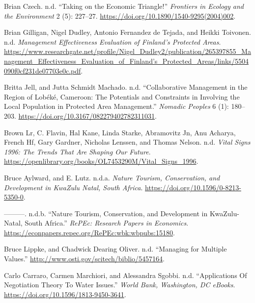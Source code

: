 \begin{CSLReferences}{1}{0}
Brian Czech. n.d. {``Taking on the Economic Triangle!''} \emph{Frontiers
in Ecology and the Environment} 2 (5): 227--27.
\url{https://doi.org/10.1890/1540-9295(2004)002}.

Brian Gilligan, Nigel Dudley, Antonio Fernandez de Tejada, and Heikki
Toivonen. n.d. \emph{Management Effectiveness Evaluation of Finland's
Protected Areas}.
\url{https://www.researchgate.net/profile/Nigel_Dudley2/publication/265397855_Management_Effectiveness_Evaluation_of_Finland’s_Protected_Areas/links/5504090f0cf231de07703e0c.pdf}.

Britta Jell, and Jutta Schmidt Machado. n.d. {``Collaborative Management
in the Region of Lobéké, Cameroon: The Potentials and Constraints in
Involving the Local Population in Protected Area Management.''}
\emph{Nomadic Peoples} 6 (1): 180--203.
\url{https://doi.org/10.3167/082279402782311031}.

Brown Lr, C. Flavin, Hal Kane, Linda Starke, Abramovitz Jn, Anu Acharya,
French Hf, Gary Gardner, Nicholas Lenssen, and Thomas Nelson. n.d.
\emph{Vital Signs 1996: The Trends That Are Shaping Our Future}.
\url{https://openlibrary.org/books/OL7453290M/Vital_Signs_1996}.

Bruce Aylward, and E. Lutz. n.d.a. \emph{Nature Tourism, Conservation,
and Development in KwaZulu Natal, South Africa}.
\url{https://doi.org/10.1596/0-8213-5350-0}.

---------. n.d.b. {``Nature Tourism, Conservation, and Development in
KwaZulu-Natal, South Africa.''} \emph{RePEc: Research Papers in
Economics}. \url{https://econpapers.repec.org/RePEc:wbk:wbpubs:15180}.

Bruce Lippke, and Chadwick Dearing Oliver. n.d. {``Managing for Multiple
Values.''} \url{http://www.osti.gov/scitech/biblio/5457164}.

Carlo Carraro, Carmen Marchiori, and Alessandra Sgobbi. n.d.
{``Applications Of Negotiation Theory To Water Issues.''} \emph{World
Bank, Washington, DC eBooks}.
\url{https://doi.org/10.1596/1813-9450-3641}.


\end{CSLReferences}
